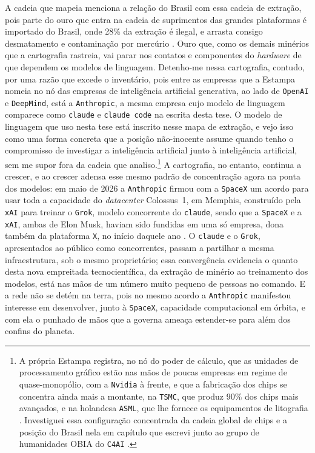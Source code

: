 A cadeia que \textcite{Estampa_Cartografia_IA} mapeia menciona a relação do Brasil com essa cadeia de extração, pois parte do ouro que entra na cadeia de suprimentos das grandes plataformas é importado do Brasil, onde 28\% da extração é ilegal, e arrasta consigo desmatamento e contaminação por mercúrio \parencite{Estampa_Cartografia_IA}. Ouro que, como os demais minérios que a cartografia rastreia, vai parar nos contatos e componentes do \emph{hardware} de que dependem os modelos de linguagem. Detenho-me nessa cartografia, contudo, por uma razão que excede o inventário, pois entre as empresas que a Estampa nomeia no nó das empresas de inteligência artificial generativa, ao lado de \texttt{OpenAI} e \texttt{DeepMind}, está a \texttt{Anthropic}, a mesma empresa cujo modelo de linguagem comparece como \texttt{claude} e \texttt{claude code} na escrita desta tese. O modelo de linguagem que uso nesta tese está inscrito nesse mapa de extração, e vejo isso como uma forma concreta que a posição não-inocente assume quando tenho o compromisso de investigar a inteligência artificial junto à inteligência artificial, sem me supor fora da cadeia que analiso.\footnote{A própria Estampa registra, no nó do poder de cálculo, que as unidades de processamento gráfico estão nas mãos de poucas empresas em regime de quase-monopólio, com a \texttt{Nvidia} à frente, e que a fabricação dos chips se concentra ainda mais a montante, na \texttt{TSMC}, que produz 90\% dos chips mais avançados, e na holandesa \texttt{ASML}, que lhe fornece os equipamentos de litografia \parencite{Estampa_Cartografia_IA}. Investiguei essa configuração concentrada da cadeia global de chips e a posição do Brasil nela em capítulo que escrevi junto ao grupo de humanidades OBIA do \texttt{C4AI} \parencite{HelanskyVeigaCerignoni2024CadeiaChips}.} A cartografia, no entanto, continua a crescer, e ao crescer adensa esse mesmo padrão de concentração agora na ponta dos modelos: em maio de 2026 a \texttt{Anthropic} firmou com a \texttt{SpaceX} um acordo para usar toda a capacidade do \emph{datacenter} Colossus~1, em Memphis, construído pela \texttt{xAI} para treinar o \texttt{Grok}, modelo concorrente do \texttt{claude}, sendo que a \texttt{SpaceX} e a \texttt{xAI}, ambas de Elon Musk, haviam sido fundidas em uma só empresa, dona também da plataforma \texttt{X}, no início daquele ano \parencite{TechCrunch2026OrbitalDC}. O \texttt{claude} e o \texttt{Grok}, apresentados ao público como concorrentes, passam a partilhar a mesma infraestrutura, sob o mesmo proprietário; essa convergência evidencia o quanto desta nova empreitada tecnocientífica, da extração de minério ao treinamento dos modelos, está nas mãos de um número muito pequeno de pessoas no comando. E a rede não se detém na terra, pois no mesmo acordo a \texttt{Anthropic} manifestou interesse em desenvolver, junto à \texttt{SpaceX}, capacidade computacional em órbita, e com ela o punhado de mãos que a governa ameaça estender-se para além dos confins do planeta.

